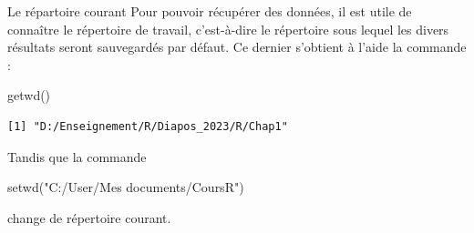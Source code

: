\documentclass[
  8pt,
  ignorenonframetext,
]{beamer}
\newenvironment{Shaded}{\begin{snugshade}}{\end{snugshade}}
\newcommand{\FunctionTok}[1]{\textcolor[rgb]{0.00,0.00,0.00}{#1}}
\newcommand{\NormalTok}[1]{#1}
\newcommand{\StringTok}[1]{\textcolor[rgb]{0.31,0.60,0.02}{#1}}
\begin{document}
\begin{frame}[fragile]{Le répartoire courant}
\protect\hypertarget{le-ruxe9partoire-courant}{}
Pour pouvoir récupérer des données, il est utile de connaître le
répertoire de travail, c'est-à-dire le répertoire sous lequel les divers
résultats seront sauvegardés par défaut. Ce dernier s'obtient à l'aide
la commande :

\begin{Shaded}
\begin{Highlighting}[]
\FunctionTok{getwd}\NormalTok{()}
\end{Highlighting}
\end{Shaded}

\begin{verbatim}
[1] "D:/Enseignement/R/Diapos_2023/R/Chap1"
\end{verbatim}

Tandis que la commande

\begin{Shaded}
\begin{Highlighting}[]
\FunctionTok{setwd}\NormalTok{(}\StringTok{"C:/User/Mes documents/CoursR"}\NormalTok{)}
\end{Highlighting}
\end{Shaded}

change de répertoire courant.
\end{frame}
\end{document}
